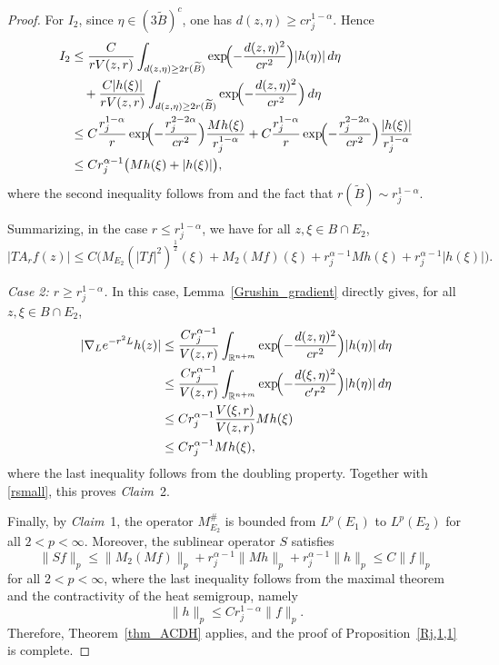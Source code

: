 \documentclass[12pt]{amsart}
\begin{document}
\begin{proof}
For $I_2$, since $\eta \in (3 \widetilde{B})^c$, one has $d(z,\eta)\ge c r_j^{1-\alpha}$. Hence
\begin{align*}
    I_2
    &\le \frac{C}{r V(z,r)} \int_{d(z,\eta)\ge 2r(\widetilde{B})} \exp\!\Bigl(-\frac{d(z,\eta)^2}{c r^2}\Bigr) |h(\eta)| \, d\eta\\
    &\quad + \frac{C|h(\xi)|}{r V(z,r)} \int_{d(z,\eta)\ge 2r(\widetilde{B})} \exp\!\Bigl(-\frac{d(z,\eta)^2}{c r^2}\Bigr) \, d\eta\\
    &\le C\frac{r_j^{1-\alpha}}{r} \exp\!\Bigl(-\frac{r_j^{2-2\alpha}}{c r^2}\Bigr) \frac{Mh(\xi)}{r_j^{1-\alpha}} + C\frac{r_j^{1-\alpha}}{r} \exp\!\Bigl(-\frac{r_j^{2-2\alpha}}{c r^2}\Bigr) \frac{|h(\xi)|}{r_j^{1-\alpha}}\\
    &\le C r_j^{\alpha-1}\bigl( Mh(\xi) + |h(\xi)| \bigr),
\end{align*}
where the second inequality follows from \cite[Lemma~3.1]{CD} and the fact that $r(\widetilde{B}) \sim r_j^{1-\alpha}$.

Summarizing, in the case $r\le r_j^{1-\alpha}$, we have for all $z,\xi \in B \cap E_2$,
\begin{equation}\label{rsmall}
    |TA_rf(z)| \le C \bigl( M_{E_2}(|Tf|^2)^{\frac{1}{2}}(\xi) +  M_2( Mf )(\xi) + r_j^{\alpha-1} Mh(\xi) + r_j^{\alpha-1} |h(\xi)| \bigr).
\end{equation}

\textit{Case 2: $r\ge r_j^{1-\alpha}$.} In this case, Lemma~\ref{Grushin_gradient} directly gives, for all $z,\xi\in B \cap E_2$,
\begin{align*}
    |\nabla_L e^{-r^2L}h(z)|
    &\le \frac{C r_j^{\alpha-1}}{V(z,r)}  \int_{\mathbb{R}^{n+m}} \exp\!\Bigl( - \frac{d(z,\eta)^2}{c r^2} \Bigr) |h(\eta)| \, d\eta\\
    &\le \frac{C r_j^{\alpha-1}}{V(z,r)}  \int_{\mathbb{R}^{n+m}} \exp\!\Bigl( - \frac{d(\xi,\eta)^2}{c' r^2} \Bigr) |h(\eta)| \, d\eta\\
    &\le C r_j^{\alpha-1} \frac{V(\xi,r)}{V(z,r)} Mh(\xi)\\
    &\le C r_j^{\alpha-1} Mh(\xi),
\end{align*}
where the last inequality follows from the doubling property. Together with \eqref{rsmall}, this proves \textit{Claim}~2.

Finally, by \textit{Claim}~1, the operator $M_{E_2}^{\#}$ is bounded from $L^p(E_1)$ to $L^p(E_2)$ for all $2<p<\infty$. Moreover, the sublinear operator $S$ satisfies
\begin{equation*}
    \|Sf\|_p \le \| M_2( Mf ) \|_p + r_j^{\alpha-1} \| Mh \|_p + r_j^{\alpha-1} \|h\|_p \le C \|f\|_p
\end{equation*}
for all $2<p<\infty$, where the last inequality follows from the maximal theorem and the contractivity of the heat semigroup, namely
\begin{equation*}
    \|h\|_p \le C r_j^{1-\alpha}\|f\|_p.
\end{equation*}
Therefore, Theorem~\ref{thm_ACDH} applies, and the proof of Proposition~\ref{Rj,1,1} is complete.
\end{proof}
\end{document}
